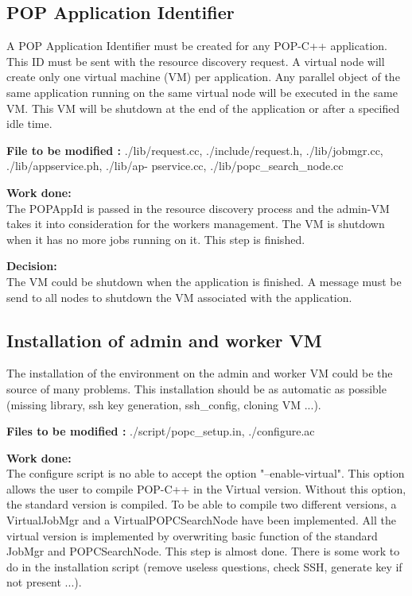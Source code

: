 \subsection{POP Application Identifier}
A POP Application Identifier must be created for any POP-C++ application. This ID must be sent with the resource discovery request. A virtual node will create only one virtual machine (VM) per application. Any parallel object of the same application running on the same virtual node will be executed in the same VM. This VM will be shutdown at the end of the application or after a specified idle time.\s

\textbf{File to be modified : } ./lib/request.cc, ./include/request.h, ./lib/jobmgr.cc, ./lib/appservice.ph, ./lib/ap- pservice.cc, ./lib/popc\_search\_node.cc\s

\textbf{Work done:}\\
The POPAppId is passed in the resource discovery process and the admin-VM takes it into consideration for the workers management. The VM is shutdown when it has no more jobs running on it. This step is finished.\s

\textbf{Decision:}\\
The VM could be shutdown when the application is finished. A message must be send to all nodes to shutdown the VM associated with the application.

\subsection{Installation of admin and worker VM}
The installation of the environment on the admin and worker VM could be the source of many problems. This installation should be as automatic as possible (missing library, ssh key generation, ssh\_config, cloning VM ...).\s

\textbf{Files to be modified : } ./script/popc\_setup.in, ./configure.ac\s

\textbf{Work done:}\\
The configure script is no able to accept the option "--enable-virtual". This option allows the user to compile POP-C++ in the Virtual version. Without this option, the standard version is compiled. To be able to compile two different versions, a VirtualJobMgr and a VirtualPOPCSearchNode have been implemented. All the virtual version is implemented by overwriting basic function of the standard JobMgr and POPCSearchNode. This step is almost done. There is some work to do in the installation script (remove useless questions, check SSH, generate key if not present ...). \s

